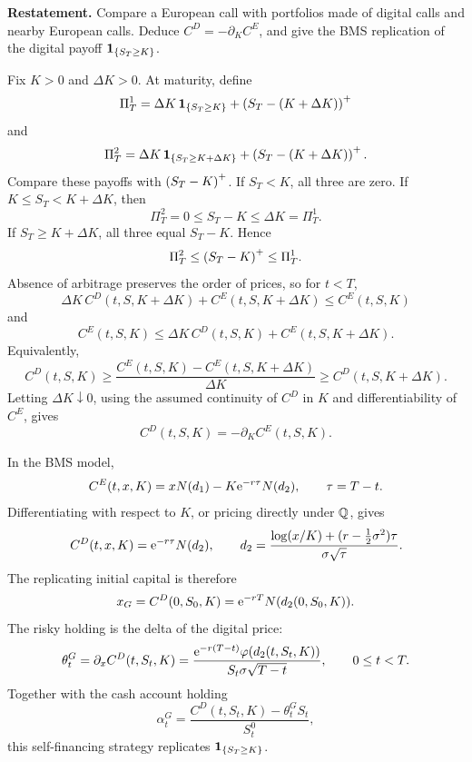\begin{exercise}
\textbf{Restatement.}
Compare a European call with portfolios made of digital calls and nearby
European calls.  Deduce \(C^D=-\partial_KC^E\), and give the BMS replication of
the digital payoff \(\mathbf{1}_{\{S_T\ge K\}}\).

\begin{solution}
Fix \(K>0\) and \(\Delta K>0\).  At maturity, define
\[
  \Pi_T^1=\Delta K\,\mathbf{1}_{\{S_T\ge K\}}+\left(S_T-(K+\Delta K)\right)^+
\]
and
\[
  \Pi_T^2=\Delta K\,\mathbf{1}_{\{S_T\ge K+\Delta K\}}+\left(S_T-(K+\Delta K)\right)^+.
\]
Compare these payoffs with \(\left(S_T-K\right)^+\).  If \(S_T<K\), all three are zero.
If \(K\le S_T<K+\Delta K\), then
\[
  \Pi_T^2=0\le S_T-K\le\Delta K=\Pi_T^1.
\]
If \(S_T\ge K+\Delta K\), all three equal \(S_T-K\).  Hence
\[
  \Pi_T^2\le\left(S_T-K\right)^+\le\Pi_T^1.
\]
Absence of arbitrage preserves the order of prices, so for \(t<T\),
\[
  \Delta K\,C^D(t,S,K+\Delta K)+C^E(t,S,K+\Delta K)
  \le C^E(t,S,K)
\]
and
\[
  C^E(t,S,K)
  \le \Delta K\,C^D(t,S,K)+C^E(t,S,K+\Delta K).
\]
Equivalently,
\[
  C^D(t,S,K)
  \ge
  \frac{C^E(t,S,K)-C^E(t,S,K+\Delta K)}{\Delta K}
  \ge
  C^D(t,S,K+\Delta K).
\]
Letting \(\Delta K\downarrow0\), using the assumed continuity of \(C^D\) in
\(K\) and differentiability of \(C^E\), gives
\[
  C^D(t,S,K)=-\partial_KC^E(t,S,K).
\]

In the BMS model,
\[
  C^E(t,x,K)=xN(d_1)-K\mathrm{e}^{-r\tau}N(d_2),
  \qquad \tau=T-t.
\]
Differentiating with respect to \(K\), or pricing directly under \(\mathbb{Q}\), gives
\[
  C^D(t,x,K)=\mathrm{e}^{-r\tau}N(d_2),
  \qquad
  d_2=\frac{\log(x/K)+(r-\frac12\sigma^2)\tau}{\sigma\sqrt{\tau}}.
\]
The replicating initial capital is therefore
\[
  x_G=C^D(0,S_0,K)=\mathrm{e}^{-rT}N(d_2(0,S_0,K)).
\]
The risky holding is the delta of the digital price:
\[
  \theta_t^G
    =\partial_xC^D(t,S_t,K)
    =\frac{\mathrm{e}^{-r(T-t)}\varphi(d_2(t,S_t,K))}
      {S_t\sigma\sqrt{T-t}},
  \qquad 0\le t<T.
\]
Together with the cash account holding
\[
  \alpha_t^G
    =\frac{C^D(t,S_t,K)-\theta_t^G S_t}{S_t^0},
\]
this self-financing strategy replicates \(\mathbf{1}_{\{S_T\ge K\}}\).
\end{solution}
\end{exercise}
